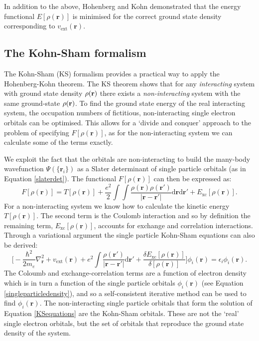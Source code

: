 In addition to the above, Hohenberg and Kohn demonstrated that the energy functional $E\left[\rho(\textbf{r})\right]$ is minimised for the correct ground state density corresponding to $v_\mathrm{ext}(\textbf{r})$.\autocite{Hohenberg1964}

\subsection{The Kohn-Sham formalism} \label{KSformalismsubsection}

The Kohn-Sham (KS) formalism provides a practical way to apply the Hohenberg-Kohn theorem. The KS theorem shows that for any \textit{interacting} system with ground state density $\rho(\textbf{\textrm{r}})$ there exists a \textit{non-interacting} system with the same ground-state $\rho(\textbf{\textrm{r}})$. To find the ground state energy of the real interacting system, the occupation numbers of fictitious, non-interacting single electron orbitals can be optimised. This allows for a `divide and conquer' approach to the problem of specifying $F\left[\rho(\textbf{r})\right]$, as for the non-interacting system we can calculate some of the terms exactly.

We exploit the fact that the orbitals are non-interacting to build the many-body wavefunction $\Psi(\{\textbf{r}_i\})$ as a Slater determinant of single particle orbitals (as in Equation \ref{slaterdet}). The functional $F\left[\rho(\textbf{r})\right]$ can then be expressed as:\autocite{Kaxiras2007}
\begin{equation}
F\left[\rho(\textbf{r})\right] = T\left[\rho(\textbf{r})\right] + \frac{e^2}{2}\int\int\frac{\rho(\textbf{r})\rho(\textbf{r}')}{\lvert\mathbf{r}-\mathbf{r}'\rvert}\textrm{d}\mathbf{r}\textrm{d}\mathbf{r}' + E_\mathrm{xc}\left[\rho(\textbf{r})\right].
\end{equation}
For a non-interacting system we know how to calculate the kinetic energy $T\left[\rho(\textbf{r})\right]$. The second term is the Coulomb interaction and so by definition the remaining term, $E_{\textrm{xc}}\left[\rho(\textbf{r})\right]$, accounts for exchange and correlation interactions.
Through a variational argument the single particle Kohn-Sham equations can also be derived:\autocite{Kaxiras2007}
\begin{equation} \label{KSequations}
\bigg[-\frac{\hbar^2}{2m_e}\nabla_{\textbf{r}}^2+v_{\textrm{ext}}(\textbf{r})+ {e^2}\int\frac{\rho(\textbf{r}')}{\lvert\mathbf{r}-\mathbf{r}'\rvert}\textrm{d}\mathbf{r}'+\frac{\delta E_{\textrm{xc}}\left[\rho(\textbf{r})\right]}{\delta \left[\rho(\textbf{r})\right] } \bigg]\phi_i(\textbf{r})=\epsilon_i\phi_i(\textbf{r}).
\end{equation} 
The Coloumb and exchange-correlation terms are a function of electron density which is in turn a function of the single particle orbitals $\phi_i(\textbf{r})$ (see Equation \ref{singleparticledensity}), and so a self-consistent iterative method can be used to find $\phi_i(\textbf{r})$. The non-interacting single particle orbitals that form the solution of Equation \ref{KSequations} are the Kohn-Sham orbitals. These are not the `real' single electron orbitals, but the set of orbitals that reproduce the ground state density of the system. 

